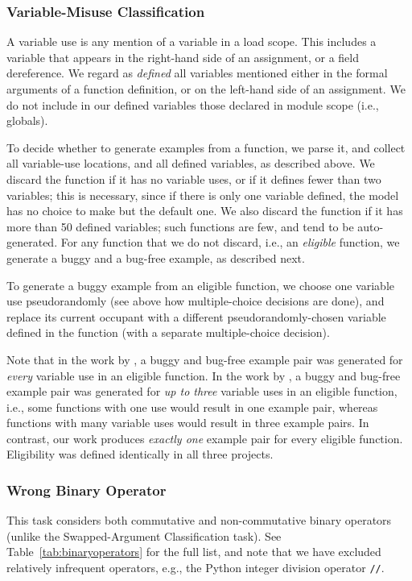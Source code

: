 \documentclass{article}
\begin{document}
\subsubsection{Variable-Misuse Classification}
\label{sec:varmisuseclassificationdata}
A variable use is any mention of a variable in a load scope. This includes a variable that appears in the right-hand side of an assignment, or a field dereference. We regard as \emph{defined} all variables mentioned either in the formal arguments of a function definition, or on the left-hand side of an assignment. We do not include in our defined variables those declared in module scope (i.e., globals).

To decide whether to generate examples from a function, we parse it, and collect all variable-use locations, and all defined variables, as described above. We discard the function if it has no variable uses, or if it defines fewer than two variables; this is necessary, since if there is only one variable defined, the model has no choice to make but the default one. We also discard the function if it has more than \num{50} defined variables; such functions are few, and tend to be auto-generated. For any function that we do not discard, i.e., an \emph{eligible} function, we generate a buggy and a bug-free example, as described next.

To generate a buggy example from an eligible function, we choose one variable use pseudorandomly (see above how multiple-choice decisions are done), and replace its current occupant with a different pseudorandomly-chosen variable defined in the function (with a separate multiple-choice decision).

Note that in the work by \citet{DBLP:journals/corr/abs-1904-01720}, a buggy and bug-free example pair was generated for \emph{every} variable use in an eligible function. In the work by \citet{hellendoorn2020global}, a buggy and bug-free example pair was generated for \emph{up to three} variable uses in an eligible function, i.e., some functions with one use would result in one example pair, whereas functions with many variable uses would result in three example pairs. In contrast, our work produces \emph{exactly one} example pair for every eligible function. Eligibility was defined identically in all three projects.

\subsubsection{Wrong Binary Operator}
This task considers both commutative and non-commutative binary operators (unlike the Swapped-Argument Classification task). See Table~\ref{tab:binaryoperators} for the full list, and note that we have excluded relatively infrequent operators, e.g., the Python integer division operator \texttt{//}.
\end{document}
